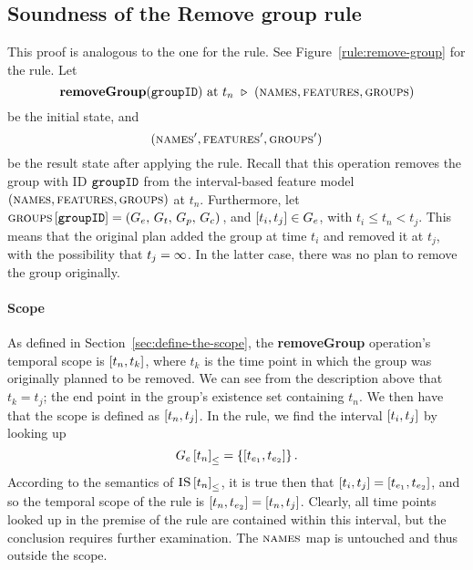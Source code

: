 \subsection{Soundness of the Remove group rule}
\label{sub:soundness-of-the-remove-group-rule}
This proof is analogous to the one for the  rule.
See Figure~\vref{rule:remove-group} for the  rule. Let
\[
      \textbf{removeGroup}(\texttt{groupID}) \text{ at } t_n \ \triangleright \  (\textsc{names}, \textsc{features}, \textsc{groups}{})
\]
be the initial state, and
\[
   (\textsc{names}', \textsc{features}', \textsc{groups}{}')
\]
be the result state after applying the  rule. Recall that this operation removes the group with ID $\texttt{groupID}$ from the interval-based feature model $(\textsc{names}, \textsc{features}, \textsc{groups}{})$ at $t_n$. Furthermore, let $\textsc{groups}{} \left[ \texttt{groupID} \right] = \left(G_e,\, G_t,\, G_p,\, G_c\right){}$, and $\interval{t_i}{t_j} \in G_e$, with $t_i \leq t_n < t_j$. This means that the original plan added the group at time $t_i$ and removed it at $t_j$, with the possibility that $t_j = \infty$. In the latter case, there was no plan to remove the group originally.

\paragraph{Scope}

As defined in Section~\vref{sec:define-the-scope}, the \textbf{removeGroup} operation's temporal scope is $\interval{t_n}{t_k}$, where $t_k$ is the time point in which the group was originally planned to be removed. We can see from the description above that $t_k = t_j$; the end point in the group's existence set containing $t_n$. We then have that the scope is defined as $\interval{t_n}{t_j}$. In the rule, we find the interval $\interval{t_i}{t_j}$ by looking up
\[
   \containing{G_e}{t_n} = \set{\interval{t_{e_1}}{t_{e_2}}}.
\]
According to the semantics of ${\textsc{IS} \left[ t_n \right]}_{\leq}$, it is true then that $\interval{t_i}{t_j} = \interval{t_{e_1}}{t_{e_2}}$, and so the temporal scope of the rule is $\interval{t_n}{t_{e_2}} = \interval{t_n}{t_j}$. Clearly, all time points looked up in the premise of the rule are contained within this interval, but the conclusion requires further examination. The $\textsc{names}{}$ map is untouched and thus outside the scope. 

